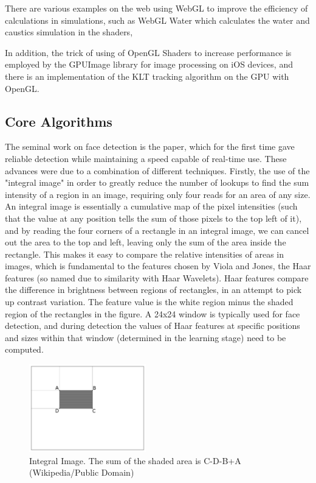 \documentclass[a4paper]{article}
\begin{document}
There are various examples on the web using WebGL to improve the efficiency of calculations in simulations, such as WebGL Water \cite{Wallace} which calculates the water and caustics simulation in the shaders, 

In addition, the trick of using of OpenGL Shaders to increase performance is employed by the GPUImage library \cite{Larson} for image processing on iOS devices, and there is an implementation of the KLT tracking algorithm \cite{Sinha} on the GPU with OpenGL.

\subsection{Core Algorithms}

The seminal work on face detection is the \cite{ViolaJones01} paper, which for the first time gave reliable detection while maintaining a speed capable of real-time use. These advances were due to a combination of different techniques. Firstly, the use of the "integral image" in order to greatly reduce the number of lookups to find the sum intensity of a region in an image, requiring only four reads for an area of any size. An integral image is essentially a cumulative map of the pixel intensities (such that the value at any position tells the sum of those pixels to the top left of it), and by reading the four corners of a rectangle in an integral image, we can cancel out the area to the top and left, leaving only the sum of the area inside the rectangle. This makes it easy to compare the relative intensities of areas in images, which is fundamental to the features chosen by Viola and Jones, the Haar features (so named due to similarity with Haar Wavelets). Haar features compare the difference in brightness between regions of rectangles, in an attempt to pick up contrast variation. The feature value is the white region minus the shaded region of the rectangles in the figure. A 24x24 window is typically used for face detection, and during detection the values of Haar features at specific positions and sizes within that window (determined in the learning stage) need to be computed. 


\begin{figure}
    \centering
    \includegraphics[width=2.0in]{integral.png}
    \caption{Integral Image. The sum of the shaded area is C-D-B+A (Wikipedia/Public Domain)}
\end{figure}
\end{document}
